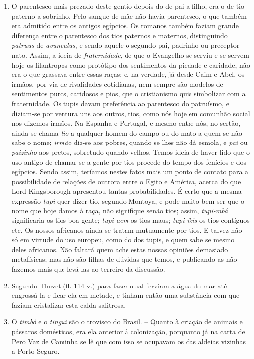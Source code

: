 \begin{enumerate}
\item O parentesco mais prezado deste gentio depois do de pai a filho, era o de tio 
paterno a sobrinho. Pelo sangue de mãe não havia parentesco, o que também era 
admitido entre os antigos egípcios. Os romanos também faziam grande diferença entre 
o parentesco dos tios paternos e maternos, distinguindo \textit{patruus} de \textit{avunculus}, e sendo 
aquele o segundo pai, padrinho ou preceptor nato. Assim, a ideia de \textit{fraternidade}, de 
que o Evangelho se serviu e se servem hoje os filantropos como protótipo dos 
sentimentos da piedade e caridade, não era o que grassava entre essas raças; e, na 
verdade, já desde Caim e Abel, os irmãos, por via de rivalidades cotidianas, nem 
sempre são modelos de sentimentos puros, caridosos e pios, que o cristianismo quis 
simbolizar com a fraternidade. Os tupis davam preferência ao parentesco do patruísmo, 
e diziam-se por ventura uns aos outros, tios, como nós hoje em comunhão social nos 
dizemos irmãos. Na Espanha e Portugal, e mesmo entre nós, no sertão, ainda se chama 
\textit{tio} a qualquer homem do campo ou do mato a quem se não sabe o nome; \textit{irmão} diz-se 
aos pobres, quando se lhes não dá esmola, e \textit{pai} ou \textit{paizinho} aos pretos, sobretudo 
quando velhos. Temos ideia de haver lido que o uso antigo de chamar-se a gente por 
tios procede do tempo dos fenícios e dos egípcios. Sendo assim, teríamos nestes 
fatos mais um ponto de contato para a possibilidade de relações de outrora entre o Egito 
e América, acerca do que Lord Kingsborough apresentou tantas probabilidades. É certo 
que a mesma expressão \textit{tupi} quer dizer tio, segundo Montoya, e pode muito bem ser 
que o nome que hoje damos à raça, não signifique senão tios; assim, \textit{tupi-mbá} 
significaria os tios boa gente;  \textit{tupi-aem} os tios maus; \textit{tupi-ikis} os tios contíguos etc. 
Os nossos africanos ainda se tratam mutuamente por tios. E talvez não só em virtude do 
uso europeu, como do dos tupis, e quem sabe se mesmo deles africanos. Não faltará 
quem ache estas nossas opiniões demasiado metafísicas; mas não são filhas de dúvidas 
que temos, e publicando-as não fazemos mais que levá-las ao terreiro da discussão.

\item Segundo Thevet (fl. 114 v.) para fazer o sal ferviam a água do mar até engrossá-la 
e ficar ela em metade, e tinham então uma substância com que faziam cristalizar esta 
calda salitrosa.

\item O \textit{timbó} e o \textit{tingui} são o trovisco do Brasil. -- Quanto à criação de animais e 
pássaros domésticos, era ela anterior à colonização, porquanto já na carta de Pero Vaz 
de Caminha se lê que com isso se ocupavam os das aldeias vizinhas a Porto Seguro.


\end{enumerate}
